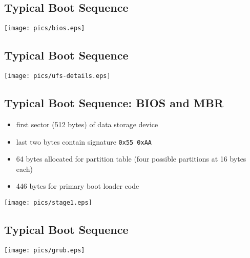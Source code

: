 \documentclass[xga]{xdvislides}
\begin{document}
\subsection{Typical Boot Sequence}
\vspace*{\fill}
\begin{center}
	\texttt{[image: pics/bios.eps]} \\
\end{center}
\vspace*{\fill}

\subsection{Typical Boot Sequence}
\vspace*{\fill}
\begin{center}
	\texttt{[image: pics/ufs-details.eps]} \\
\end{center}
\vspace*{\fill}

\subsection{Typical Boot Sequence: BIOS and MBR}
\begin{minipage}[c]{0.7\textwidth}
\begin{itemize}
	\item first sector (512 bytes) of data storage device
	\item last two bytes contain signature \verb+0x55 0xAA+
	\item 64 bytes allocated for partition table (four possible
		partitions at 16 bytes each)
	\item 446 bytes for primary boot loader code
\end{itemize}
\end{minipage}
\begin{minipage}[c]{0.1\textwidth}
\texttt{[image: pics/stage1.eps]} \\
\end{minipage}


\subsection{Typical Boot Sequence}
\vspace*{\fill}
\begin{center}
	\texttt{[image: pics/grub.eps]} \\
\end{center}
\vspace*{\fill}
\end{document}
